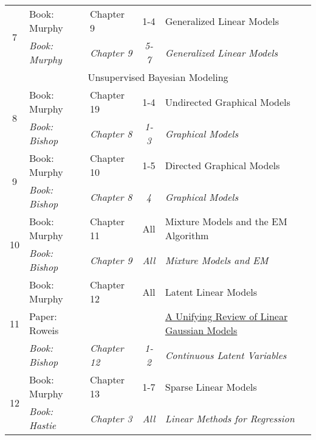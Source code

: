 \documentclass[12pt]{article}
\begin{document}
{\begin{table}
\begin{center}
\begin{tabular}{| c | l | l | c | p{6 cm} |}
            \hline
            \multirow{2}{*}{7} & Book: Murphy & Chapter 9 & 1-4 & Generalized Linear Models \\
                               & \textit{Book: Murphy} & \textit{Chapter 9} & \textit{5-7} & \textit{Generalized Linear Models} \\
            \hline
            \multicolumn{5}{|c|}{Unsupervised Bayesian Modeling} \\
            \hline
            \multirow{2}{*}{8} & Book: Murphy & Chapter 19 & 1-4 & Undirected Graphical Models \\
                               & \textit{Book: Bishop} & \textit{Chapter 8} & \textit{1-3} & \textit{Graphical Models} \\
            \hline
            \multirow{2}{*}{9} & Book: Murphy & Chapter 10 & 1-5 & Directed Graphical Models \\
                               & \textit{Book: Bishop} & \textit{Chapter 8} & \textit{4} & \textit{Graphical Models} \\
            \hline
            \multirow{2}{*}{10} & Book: Murphy & Chapter 11 & All & Mixture Models and the EM Algorithm \\
                               & \textit{Book: Bishop} & \textit{Chapter 9} & \textit{All} & \textit{Mixture Models and EM} \\
            \hline
            \multirow{3}{*}{11} & Book: Murphy & Chapter 12 & All & Latent Linear Models \\
                                & Paper: Roweis & & & \href{http://web-static-aws.seas.harvard.edu/courses/cs281/papers/lds.pdf}{A Unifying Review of Linear Gaussian Models} \\
                               & \textit{Book: Bishop} & \textit{Chapter 12} & \textit{1-2} & \textit{Continuous Latent Variables} \\
            \hline
            \multirow{2}{*}{12} & Book: Murphy & Chapter 13 & 1-7 & Sparse Linear Models \\
                               & \textit{Book: Hastie} & \textit{Chapter 3} & \textit{All} & \textit{Linear Methods for Regression} \\
            \hline
        \end{tabular}
    \end{center}
    \end{table}

}
\end{document}
